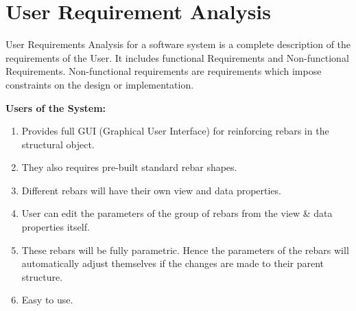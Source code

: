\section{User Requirement Analysis}
User Requirements Analysis for a software system is a complete description of the requirements of the User. It includes functional Requirements
and Non-functional Requirements. Non-functional requirements are
requirements which impose constraints on the design or implementation.

 
{\bf Users of the System:}
    \begin{enumerate}
        \item Provides full GUI (Graphical User Interface) for reinforcing rebars in the structural object.
        \item They also requires pre-built standard rebar shapes.
        \item Different rebars will have their own view and data properties.
        \item User can edit the parameters of the group of rebars from the view \& data properties itself.
        \item These rebars will be fully parametric. Hence the parameters of the rebars will automatically adjust themselves if the changes are made to their parent structure.
        \item Easy to use. 
               
    \end{enumerate}


